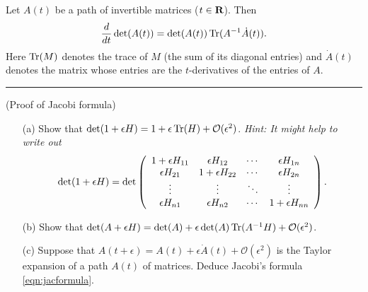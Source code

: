 \documentclass[12pt]{article}
\begin{document}
\begin{lma}
Let $A(t)$ be a path of invertible matrices ($t\in\mathbf{R}$). Then
\begin{equation}\label{eqn:jacformula}
\frac{d}{dt}\det(A(t))=\det(A(t))\operatorname{Tr}(A^{-1}\dot{A}(t)).
\end{equation}
Here $\operatorname{Tr}(M)$ denotes the trace of $M$ (the sum of its diagonal entries) and $\dot{A}(t)$ denotes the matrix whose entries are the $t$-derivatives of the entries of $A$.
\end{lma}
\bigskip
\hrule
\bigskip

\begin{question}(Proof of Jacobi formula)\\
\begin{enumerate}
\item[(a)] Show that $\det(1+\epsilon H)=1+\epsilon\operatorname{Tr}(H)+\mathcal{O}(\epsilon^2)$. {\em Hint: It might help to write out}
\[\det(1+\epsilon H)=\det\left(\begin{array}{cccc}1+\epsilon H_{11} & \epsilon H_{12} & \cdots & \epsilon H_{1n}\\ \epsilon H_{21} & 1+\epsilon H_{22} & \cdots & \epsilon H_{2n}\\ \vdots & \vdots & \ddots & \vdots\\ \epsilon H_{n1} & \epsilon H_{n2} & \cdots & 1+\epsilon H_{nn}\end{array}\right).\]
\item[(b)] Show that $\det(A+\epsilon H)=\det(A)+\epsilon\det(A)\operatorname{Tr}(A^{-1}H)+\mathcal{O}(\epsilon^2)$.
\item[(c)] Suppose that $A(t+\epsilon)=A(t)+\epsilon\dot{A}(t)+\mathcal{O}(\epsilon^2)$ is the Taylor expansion of a path $A(t)$ of matrices. Deduce Jacobi's formula \eqref{eqn:jacformula}.
\end{enumerate}
\end{question}
\end{document}
